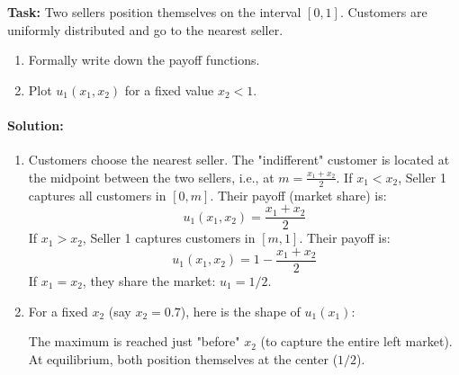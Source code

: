 \begin{exemple}
\textbf{Task:} Two sellers position themselves on the interval $[0, 1]$. Customers are uniformly distributed and go to the nearest seller.
\begin{enumerate}
    \item Formally write down the payoff functions.
    \item Plot $u_1(x_1, x_2)$ for a fixed value $x_2 < 1$.
\end{enumerate}

\paragraph{Solution:}
\begin{enumerate}
    \item Customers choose the nearest seller. The "indifferent" customer is located at the midpoint between the two sellers, i.e., at $m = \frac{x_1 + x_2}{2}$.
   If $x_1 < x_2$, Seller 1 captures all customers in $[0, m]$. Their payoff (market share) is:
   $$u_1(x_1, x_2) = \frac{x_1 + x_2}{2}$$
   If $x_1 > x_2$, Seller 1 captures customers in $[m, 1]$. Their payoff is:
   $$u_1(x_1, x_2) = 1 - \frac{x_1 + x_2}{2}$$
   If $x_1 = x_2$, they share the market: $u_1 = 1/2$.

    \item For a fixed $x_2$ (say $x_2 = 0.7$), here is the shape of $u_1(x_1)$:
\begin{center}
\end{center}
The maximum is reached just "before" $x_2$ (to capture the entire left market). At equilibrium, both position themselves at the center ($1/2$).
\end{enumerate}
\end{exemple}
